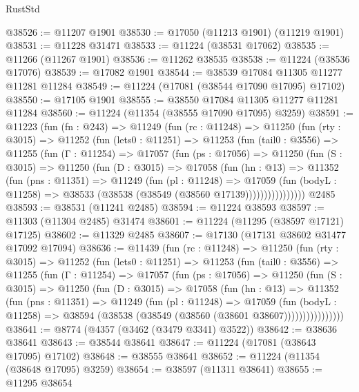 \begin{lexlean}{RustStd}
\begin{coremodule}
@38526 := @11207 @1901
@38530 := @17050 (@11213 @1901) (@11219 @1901)
@38531 := @11228 @31471
@38533 := @11224 (@38531 @17062)
@38535 := @11266 (@11267 @1901)
@38536 := @11262 @38535
@38538 := @11224 (@38536 @17076)
@38539 := @17082 @1901
@38544 := @38539 @17084 @11305 @11277 @11281 @11284
@38549 := @11224 (@17081 (@38544 @17090 @17095) @17102)
@38550 := @17105 @1901
@38555 := @38550 @17084 @11305 @11277 @11281 @11284
@38560 := @11224 (@11354 (@38555 @17090 @17095) @3259)
@38591 := @11223
    (fun (fn : @243) =>
    @11249
      (fun (rc : @11248) =>
      @11250
        (fun (rty : @3015) =>
        @11252
          (fun (lets0 : @11251) =>
          @11253
            (fun (tail0 : @3556) =>
            @11255
              (fun (Γ : @11254) =>
              @17057
                (fun (ps : @17056) =>
                @11250
                  (fun (S : @3015) =>
                  @11250
                    (fun (D : @3015) =>
                    @17058
                      (fun (hn : @13) =>
                      @11352
                        (fun (pns : @11351) =>
                        @11249
                          (fun (pl : @11248) =>
                          @17059
                            (fun (bodyL : @11258) =>
                            @38533 (@38538 (@38549 (@38560 @17139))))))))))))))))
    @2485
@38593 := @38531 (@11241 @2485)
@38594 := @11224 @38593
@38597 := @11303 (@11304 @2485) @31474
@38601 := @11224 (@11295 (@38597 @17121) @17125)
@38602 := @11329 @2485
@38607 := @17130 (@17131 @38602 @31477 @17092 @17094)
@38636 := @11439
    (fun (rc : @11248) =>
    @11250
      (fun (rty : @3015) =>
      @11252
        (fun (lets0 : @11251) =>
        @11253
          (fun (tail0 : @3556) =>
          @11255
            (fun (Γ : @11254) =>
            @17057
              (fun (ps : @17056) =>
              @11250
                (fun (S : @3015) =>
                @11250
                  (fun (D : @3015) =>
                  @17058
                    (fun (hn : @13) =>
                    @11352
                      (fun (pns : @11351) =>
                      @11249
                        (fun (pl : @11248) =>
                        @17059
                          (fun (bodyL : @11258) =>
                          @38594 (@38538 (@38549 (@38560 (@38601 @38607))))))))))))))))
@38641 := @8774 (@4357 (@3462 (@3479 @3341) @3522))
@38642 := @38636 @38641
@38643 := @38544 @38641
@38647 := @11224 (@17081 (@38643 @17095) @17102)
@38648 := @38555 @38641
@38652 := @11224 (@11354 (@38648 @17095) @3259)
@38654 := @38597 (@11311 @38641)
@38655 := @11295 @38654

\end{coremodule}
\end{lexlean}
